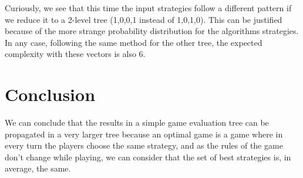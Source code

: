 \documentclass[a4paper,10pt]{article}
\begin{document}
Curiously, we see that this time the input strategies follow a different pattern
if we reduce it to a 2-level tree (1,0,0,1 instead of 1,0,1,0). This can be justified because
of the more strange probability distribution for the algorithms strategies. In any case,
following the same method for the other tree, the expected complexity with these vectors
is also $6$.

\section{Conclusion}

We can conclude that the results in a simple game evaluation tree can be propagated
in a very larger tree because an optimal game is a game where in every turn the players
choose the same strategy, and as the rules of the game don't change while playing, we can
consider that the set of best strategies is, in average, the same.
\end{document}
